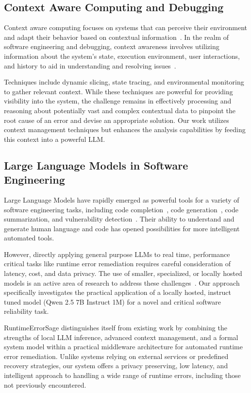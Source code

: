 \subsection{Context Aware Computing and Debugging}
Context aware computing focuses on systems that can perceive their environment and adapt their behavior based on contextual information~\cite{context_aware_computing_survey_2009}. In the realm of software engineering and debugging, context awareness involves utilizing information about the system's state, execution environment, user interactions, and history to aid in understanding and resolving issues~\cite{context-aware-debugging-2023}.

Techniques include dynamic slicing, state tracing, and environmental monitoring to gather relevant context. While these techniques are powerful for providing visibility into the system, the challenge remains in effectively processing and reasoning about potentially vast and complex contextual data to pinpoint the root cause of an error and devise an appropriate solution. Our work utilizes context management techniques but enhances the analysis capabilities by feeding this context into a powerful LLM.

\subsection{Large Language Models in Software Engineering}
Large Language Models have rapidly emerged as powerful tools for a variety of software engineering tasks, including code completion~\cite{copilot2021}, code generation~\cite{llm_code_generation_2022}, code summarization, and vulnerability detection~\cite{llm_security_applications_2023}. Their ability to understand and generate human language and code has opened possibilities for more intelligent automated tools.

However, directly applying general purpose LLMs to real time, performance critical tasks like runtime error remediation requires careful consideration of latency, cost, and data privacy. The use of smaller, specialized, or locally hosted models is an active area of research to address these challenges~\cite{local_llm_deployment_2023, edge_llm_inference_2022}. Our approach specifically investigates the practical application of a locally hosted, instruct tuned model (Qwen 2.5 7B Instruct 1M) for a novel and critical software reliability task.

RuntimeErrorSage distinguishes itself from existing work by combining the strengths of local LLM inference, advanced context management, and a formal system model within a practical middleware architecture for automated runtime error remediation. Unlike systems relying on external services or predefined recovery strategies, our system offers a privacy preserving, low latency, and intelligent approach to handling a wide range of runtime errors, including those not previously encountered.